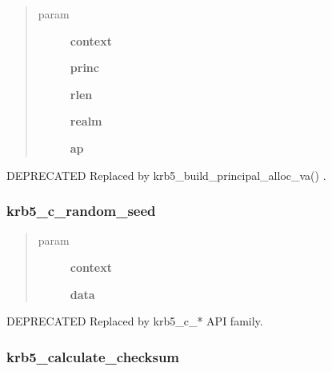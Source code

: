 \documentclass[letterpaper,10pt,english]{sphinxmanual}
\begin{document}
\begin{quote}\begin{description}
\item[{param}] \leavevmode
\textbf{context}

\textbf{princ}

\textbf{rlen}

\textbf{realm}

\textbf{ap}

\end{description}\end{quote}

DEPRECATED Replaced by krb5\_build\_principal\_alloc\_va() .


\subsubsection{krb5\_c\_random\_seed}
\label{appdev/refs/api/krb5_c_random_seed:krb5-c-random-seed}\label{appdev/refs/api/krb5_c_random_seed::doc}

\begin{fulllineitems}
\label{appdev/refs/api/krb5_c_random_seed:c.krb5_c_random_seed}
\end{fulllineitems}

\begin{quote}\begin{description}
\item[{param}] \leavevmode
\textbf{context}

\textbf{data}

\end{description}\end{quote}

DEPRECATED Replaced by krb5\_c\_* API family.


\subsubsection{krb5\_calculate\_checksum}
\label{appdev/refs/api/krb5_calculate_checksum:krb5-calculate-checksum}\label{appdev/refs/api/krb5_calculate_checksum::doc}
\end{document}
